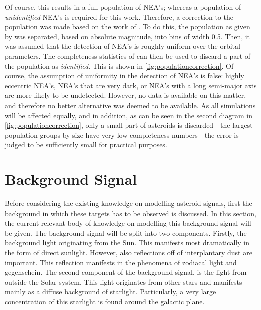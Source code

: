 Of course, this results in a full population of NEA's; whereas a population of \textit{unidentified} NEA's is required for this work. Therefore, a correction to the population was made based on the work of \cite{HarrisPopulation}. To do this, the population as given by \cite{GranvikPopulation} was separated, based on absolute magnitude, into bins of width 0.5. Then, it was assumed that the detection of NEA's is roughly uniform over the orbital parameters. The completeness statistics of \cite{HarrisPopulation} can then be used to discard a part of the population as \textit{identified}. This is shown in \autoref{fig:populationcorrection}. Of course, the assumption of uniformity in the detection of NEA's is false: highly eccentric NEA's, NEA's that are very dark, or NEA's with a long semi-major axis are more likely to be undetected. However, no data is available on this matter, and therefore no better alternative was deemed to be available. As all simulations will be affected equally, and in addition, as can be seen in the second diagram in \autoref{fig:populationcorrection}, only a small part of asteroids is discarded - the largest population groups by size have very low completeness numbers - the error is judged to be sufficiently small for practical purposes.

\section{Background Signal}
\label{sec:modelling_background}
Before considering the existing knowledge on modelling asteroid signals, first the background in which these targets has to be observed is discussed. In this section, the current relevant body of knowledge on modelling this background signal will be given. The background signal will be split into two components. Firstly, the background light originating from the Sun. This manifests most dramatically in the form of direct sunlight. However, also reflections off of interplantary dust are important. This reflection manifests in the phenomena of zodiacal light and gegenschein. The second component of the background signal, is the light from outside the Solar system. This light originates from other stars and manifests mainly as a diffuse background of starlight. Particularly, a very large concentration of this starlight is found around the galactic plane. \\

